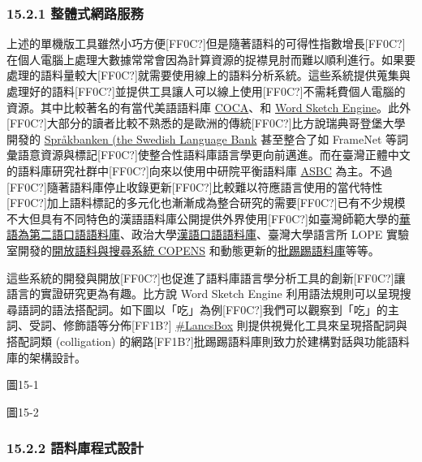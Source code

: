 \subsubsection{15.2.1 整體式網路服務}

上述的單機版工具雖然小巧方便[FF0C?]但是隨著語料的可得性指數增長[FF0C?]在個人電腦上處理大數據常常會因為計算資源的捉襟見肘而難以順利進行。如果要處理的語料量較大[FF0C?]就需要使用線上的語料分析系統。這些系統提供蒐集與處理好的語料[FF0C?]並提供工具讓人可以線上使用[FF0C?]不需耗費個人電腦的資源。其中比較著名的有當代美語語料庫 \href{https://www.english-corpora.org/coca/}{COCA}、和 \href{https://www.sketchengine.co.uk/}{Word Sketch Engine}。此外[FF0C?]大部分的讀者比較不熟悉的是歐洲的傳統[FF0C?]比方說瑞典哥登堡大學開發的 \href{http://spraakbanken.gu.se/eng}{Språkbanken (the Swedish Language Bank} 甚至整合了如 FrameNet 等詞彙語意資源與標記[FF0C?]使整合性語料庫語言學更向前邁進。而在臺灣正體中文的語料庫研究社群中[FF0C?]向來以使用中研院平衡語料庫 \href{http://asbc.iis.sinica.edu.tw}{ASBC} 為主。不過[FF0C?]隨著語料庫停止收錄更新[FF0C?]比較難以符應語言使用的當代特性[FF0C?]加上語料標記的多元化也漸漸成為整合研究的需要[FF0C?]已有不少規模不大但具有不同特色的漢語語料庫公開提供外界使用[FF0C?]如臺灣師範大學的\href{http://140.122.83.250/cwb_mp3/}{華語為第二語口語語料庫}、政治大學\href{http://140.119.172.200/%20chinese/nuucchi-about.htm}{漢語口語語料庫}、臺灣大學語言所 LOPE 實驗室開發的\href{http://lopen.linguistics.ntu.edu.tw/copens}{開放語料與搜尋系統}\href{http://lopen.linguistics.ntu.edu.tw/copens}{ COPENS} 和動態更新的\href{http://lopen.linguistics.ntu.edu.tw/pttcorp}{批踢踢語料庫}等等。

    這些系統的開發與開放[FF0C?]也促進了語料庫語言學分析工具的創新[FF0C?]讓語言的實證研究更為有趣。比方說 Word Sketch Engine 利用語法規則可以呈現搜尋語詞的語法搭配詞。如下圖以「吃」為例[FF0C?]我們可以觀察到「吃」的主詞、受詞、修飾語等分佈[FF1B?] \href{http://@brezina2018lancsbox}{\#LancsBox} 則提供視覺化工具來呈現搭配詞與搭配詞類 (colligation) 的網路[FF1B?]批踢踢語料庫則致力於建構對話與功能語料庫的架構設計。

  
 

圖15-1

  
 

圖15-2

\subsubsection{15.2.2 語料庫程式設計}

